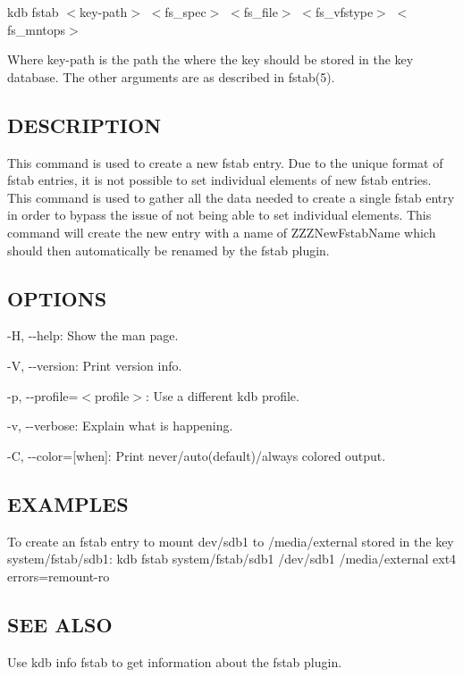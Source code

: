 {\ttfamily kdb fstab $<$key-\/path$>$ $<$fs\+\_\+spec$>$ $<$fs\+\_\+file$>$ $<$fs\+\_\+vfstype$>$ $<$fs\+\_\+mntops$>$}

Where {\ttfamily key-\/path} is the path the where the key should be stored in the key database. The other arguments are as described in fstab(5).

\subsection*{D\+E\+S\+C\+R\+I\+P\+T\+I\+O\+N}

This command is used to create a new {\ttfamily fstab} entry. Due to the unique format of {\ttfamily fstab} entries, it is not possible to set individual elements of new {\ttfamily fstab} entries. This command is used to gather all the data needed to create a single {\ttfamily fstab} entry in order to bypass the issue of not being able to set individual elements. This command will create the new entry with a name of {\ttfamily Z\+Z\+Z\+New\+Fstab\+Name} which should then automatically be renamed by the {\ttfamily fstab} plugin.

\subsection*{O\+P\+T\+I\+O\+N\+S}


\begin{DoxyItemize}
\item {\ttfamily -\/\+H}, {\ttfamily -\/-\/help}\+: Show the man page.
\item {\ttfamily -\/\+V}, {\ttfamily -\/-\/version}\+: Print version info.
\item {\ttfamily -\/p}, {\ttfamily -\/-\/profile}=$<$profile$>$\+: Use a different kdb profile.
\item {\ttfamily -\/v}, {\ttfamily -\/-\/verbose}\+: Explain what is happening.
\item {\ttfamily -\/\+C}, {\ttfamily -\/-\/color}=\mbox{[}when\mbox{]}\+: Print never/auto(default)/always colored output.
\end{DoxyItemize}

\subsection*{E\+X\+A\+M\+P\+L\+E\+S}

To create an fstab entry to mount {\ttfamily dev/sdb1} to {\ttfamily /media/external} stored in the key {\ttfamily system/fstab/sdb1}\+: {\ttfamily kdb fstab system/fstab/sdb1 /dev/sdb1 /media/external ext4 errors=remount-\/ro}

\subsection*{S\+E\+E A\+L\+S\+O}


\begin{DoxyItemize}
\item Use {\ttfamily kdb info fstab} to get information about the fstab plugin. 
\end{DoxyItemize}